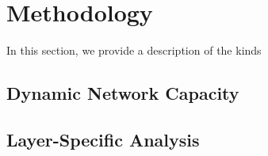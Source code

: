\chapter{Methodology}
In this section, we provide a description of the kinds 

\section{Dynamic Network Capacity}

\section{Layer-Specific Analysis}